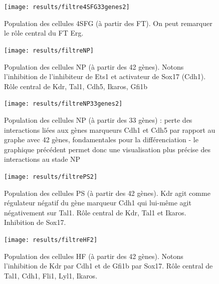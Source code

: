 \documentclass[fleqn,11pt]{SelfArx} %
\begin{document}
\begin{figure}[ht]
\centering
\texttt{[image: results/filtre4SFG33genes2]}
\caption{Population des cellules 4SFG (à partir des FT). On peut remarquer le rôle central du FT Erg.}
\label{fig:pop4SFG}
\end{figure}

\begin{figure}[ht]
\centering
\texttt{[image: results/filtreNP]}
\caption{Population des cellules NP (à partir des 42 gènes). Notons l'inhibition de l'inhibiteur de Ets1 et activateur de Sox17 (Cdh1). Rôle central de Kdr, Tal1, Cdh5, Ikaros, Gfi1b}
\label{fig:popNP}
\end{figure}

\begin{figure}[ht]
\centering
\texttt{[image: results/filtreNP33genes2]}
\caption{Population des cellules NP (à partir des 33 gènes) : perte des interactions liées aux gènes marqueurs Cdh1 et Cdh5 par rapport au graphe avec 42 gènes, fondamentales pour la différenciation - le graphique précédent permet donc une visualisation plus précise des interactions au stade NP}
\label{fig:popNP33}
\end{figure}


\begin{figure}[ht]
\centering
\texttt{[image: results/filtrePS2]}
\caption{Population des cellules PS (à partir des 42 gènes). Kdr agit comme régulateur négatif du gène marqueur Cdh1 qui lui-même agit négativement sur Tal1. Rôle central de Kdr, Tal1 et Ikaros. Inhibition de Sox17.}
\label{fig:popPS}
\end{figure}

\begin{figure}
\centering
\texttt{[image: results/filtreHF2]}
\caption{Population des cellules HF (à partir des 42 gènes). Notons l'inhibition de Kdr par Cdh1 et de Gfi1b par Sox17. Rôle central de Tal1, Cdh1, Fli1, Lyl1, Ikaros.}
\label{fig:popHF}
\end{figure}
\end{document}
